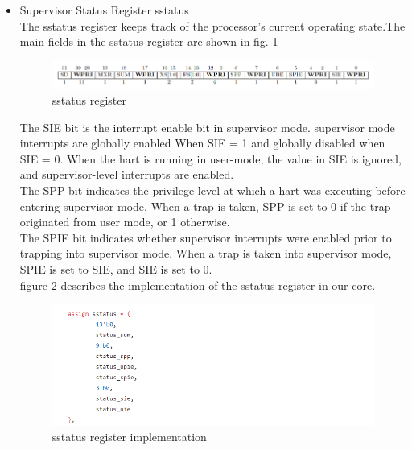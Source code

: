 \documentclass[../main.tex]{subfiles}
\begin{document}
\begin{itemize}
    \item Supervisor Status Register sstatus\\
        The sstatus register keeps track of the processor’s current operating state.The main fields in the sstatus register are shown in fig. \ref{fig:sstatus}
        \begin{figure}[h]
            \centering
            \includegraphics[width=10 cm]{diagrams/sstatus.png}
            \caption{sstatus register}
            \label{fig:sstatus}
        \end{figure}
        The SIE bit is the interrupt enable bit in supervisor mode. supervisor mode interrupts are globally enabled When SIE = 1 and globally disabled when SIE = 0. When the hart is running in user-mode, the value in SIE is ignored, and supervisor-level interrupts are enabled.\\
        The SPP bit indicates the privilege level at which a hart was executing before entering supervisor mode. When a trap is taken, SPP is set to 0 if the trap originated from user mode, or 1 otherwise.\\
        The SPIE bit indicates whether supervisor interrupts were enabled prior to trapping into supervisor mode. When a trap is taken into supervisor mode, SPIE is set to SIE, and SIE is set to 0.\\ figure \ref{fig:sstatus_imp}  describes the implementation of the sstatus register in our core.
        
        \begin{figure}[h]
            \centering
            \includegraphics[width=15 cm]{diagrams/sstatus_imp.png}
            \caption{sstatus register  implementation}
            \label{fig:sstatus_imp}
        \end{figure} \\
        

\end{itemize}
\end{document}
